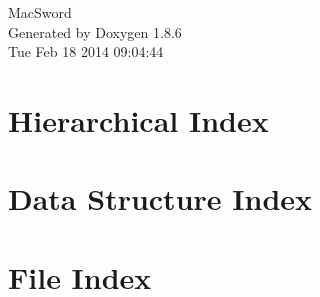 \documentclass[twoside]{book}
\newcommand{\clearemptydoublepage}{%
  \newpage{\pagestyle{empty}\cleardoublepage}%
}
\begin{document}
\hypersetup{pageanchor=false}
\begin{titlepage}
\vspace*{7cm}
\begin{center}%
{\Large Mac\-Sword }\\
\vspace*{1cm}
{\large Generated by Doxygen 1.8.6}\\
\vspace*{0.5cm}
{\small Tue Feb 18 2014 09:04:44}\\
\end{center}
\end{titlepage}
\clearemptydoublepage
\tableofcontents
\clearemptydoublepage
{}
\hypersetup{pageanchor=true}

\chapter{Hierarchical Index}

\chapter{Data Structure Index}

\chapter{File Index}

\end{document}
